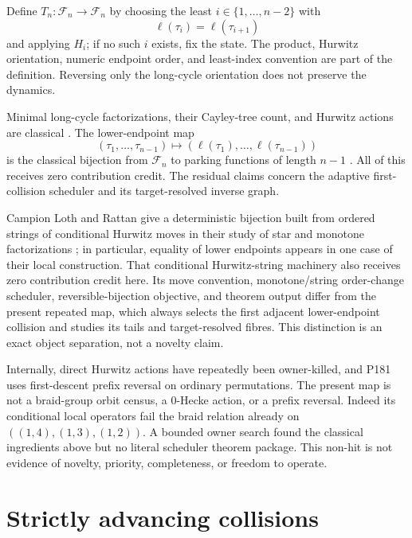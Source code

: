 \documentclass[a4paper,10pt]{amsart}
\theoremstyle{remark}
\newcommand{\Fcal}{\mathcal F}
\begin{document}
Define $T_n:\Fcal_n\to\Fcal_n$ by choosing the least
$i\in\{1,\ldots,n-2\}$ with
\begin{equation}\label{eq:collision}
 \ell(\tau_i)=\ell(\tau_{i+1})
\end{equation}
and applying $H_i$; if no such $i$ exists, fix the state.  The product,
Hurwitz orientation, numeric endpoint order, and least-index convention are
part of the definition.  Reversing only the long-cycle orientation does not
preserve the dynamics.

Minimal long-cycle factorizations, their Cayley-tree count, and Hurwitz
actions are classical \cite{Denes1959,GorskyGorsky2013}.  The lower-endpoint
map
\begin{equation}\label{eq:parking-map}
 (\tau_1,\ldots,\tau_{n-1})\longmapsto
 (\ell(\tau_1),\ldots,\ell(\tau_{n-1}))
\end{equation}
is the classical bijection from $\Fcal_n$ to parking functions of length
$n-1$ \cite{Stanley1997,IrvingRattan2021}.  All of this receives zero
contribution credit.  The residual claims concern the adaptive
first-collision scheduler and its target-resolved inverse graph.

Campion Loth and Rattan give a deterministic bijection built from ordered
strings of conditional Hurwitz moves in their study of star and monotone
factorizations \cite{CampionLothRattan2025}; in particular, equality of lower
endpoints appears in one case of their local construction.  That conditional
Hurwitz-string machinery also receives zero contribution credit here.  Its
move convention, monotone/string order-change scheduler, reversible-bijection
objective, and theorem output differ from the present repeated map, which
always selects the first adjacent lower-endpoint collision and studies its
tails and target-resolved fibres.  This distinction is an exact object
separation, not a novelty claim.

Internally, direct Hurwitz actions have repeatedly been owner-killed, and P181
uses first-descent prefix reversal on ordinary permutations.  The present
map is not a braid-group orbit census, a $0$-Hecke action, or a prefix
reversal.  Indeed its conditional local operators fail the braid relation
already on $((1,4),(1,3),(1,2))$.  A bounded owner search found the classical
ingredients above but no literal scheduler theorem package.  This non-hit is
not evidence of novelty, priority, completeness, or freedom to operate.

\section{Strictly advancing collisions}
\end{document}
